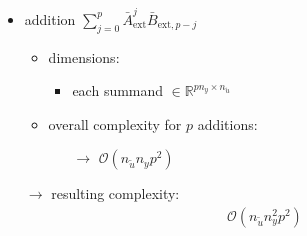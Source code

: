 \documentclass{article}
\begin{document}
\begin{itemize}
\begin{itemize}
\begin{itemize}
        \end{itemize}
    \end{itemize}
    \item addition $ \sum_{j=0}^{p} \bar{A}_\text{ext}^{j} \bar{B}_{\text{ext},p-j}$
    \begin{itemize}
        \item dimensions:
        \begin{itemize}
            \item each summand $\in \mathbb{R}^{pn_y \times n_{\tilde{u}}}$
        \end{itemize}
        \item overall complexity for $p$ additions:
        \begin{itemize}
            \item[$\rightarrow$] $\mathcal{O}(n_{\tilde{u}} n_y p^2)$
        \end{itemize}
    \end{itemize}    
    \item[$\rightarrow$] resulting complexity: \begin{align*}
        \mathcal{O}(n_{\tilde{u}} n_y^2 p^2)
    \end{align*}
\end{itemize}
\end{document}

